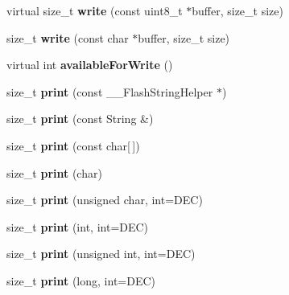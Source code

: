 \begin{DoxyCompactItemize}
\item 
\mbox{\label{class_print_a88864e109589a5be9b0f5ba1327f8421}} 
virtual size\+\_\+t {\bfseries write} (const uint8\+\_\+t $\ast$buffer, size\+\_\+t size)
\item 
\mbox{\label{class_print_abfdd93a61c4b95a3ba41680188505e73}} 
size\+\_\+t {\bfseries write} (const char $\ast$buffer, size\+\_\+t size)
\item 
\mbox{\label{class_print_ae278602698f895c25820f18da4e765be}} 
virtual int {\bfseries available\+For\+Write} ()
\item 
\mbox{\label{class_print_aa4158dd94bc1741f92d99c427261d7c0}} 
size\+\_\+t {\bfseries print} (const \+\_\+\+\_\+\+Flash\+String\+Helper $\ast$)
\item 
\mbox{\label{class_print_a157007ca7ea8334ba7eb4bc705740216}} 
size\+\_\+t {\bfseries print} (const String \&)
\item 
\mbox{\label{class_print_acfe80773011eb17dfb52c2fba517a093}} 
size\+\_\+t {\bfseries print} (const char\mbox{[}$\,$\mbox{]})
\item 
\mbox{\label{class_print_a1e411d07a8ffec5faf7ce485bac0f029}} 
size\+\_\+t {\bfseries print} (char)
\item 
\mbox{\label{class_print_a97bd44df9222fa4a51a1266fab8d3bc1}} 
size\+\_\+t {\bfseries print} (unsigned char, int=D\+EC)
\item 
\mbox{\label{class_print_a32cb3cf32d701c797b2b2d1080052dfe}} 
size\+\_\+t {\bfseries print} (int, int=D\+EC)
\item 
\mbox{\label{class_print_a87275de35583868a370f43ce1c887750}} 
size\+\_\+t {\bfseries print} (unsigned int, int=D\+EC)
\item 
\mbox{\label{class_print_ab1fb2a2384c7b9f628943f5046e7d1c1}} 
size\+\_\+t {\bfseries print} (long, int=D\+EC)
\item 
\mbox{\label{class_print_a26a40be7a557c0bc391a15dce9f06954}} 

\end{DoxyCompactItemize}
